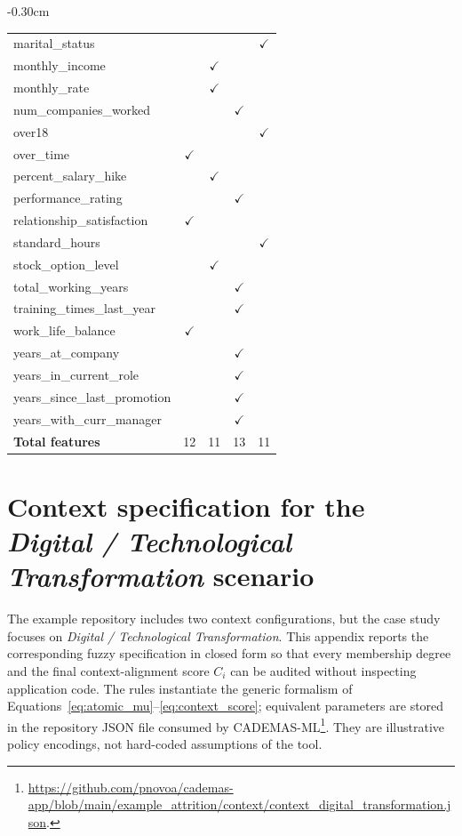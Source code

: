 \documentclass[article,submit,pdftex,moreauthors,mathematics]{Definitions/mdpi}
\begin{document}
\begin{table}[H]
\begin{adjustwidth}{-0.3\extralength}{0cm}
\begin{tabularx}{1.1\textwidth}{l|cccc}
marital\_status &  &  &  & $\checkmark$ \\
monthly\_income &  & $\checkmark$ &  &  \\
monthly\_rate &  & $\checkmark$ &  &  \\
num\_companies\_worked &  &  & $\checkmark$ &  \\
over18 &  &  &  & $\checkmark$ \\
over\_time & $\checkmark$ &  &  &  \\
percent\_salary\_hike &  & $\checkmark$ &  &  \\
performance\_rating &  &  & $\checkmark$ &  \\
relationship\_satisfaction & $\checkmark$ &  &  &  \\
standard\_hours &  &  &  & $\checkmark$ \\
stock\_option\_level &  & $\checkmark$ &  &  \\
total\_working\_years &  &  & $\checkmark$ &  \\
training\_times\_last\_year &  &  & $\checkmark$ &  \\
work\_life\_balance & $\checkmark$ &  &  &  \\
years\_at\_company &  &  & $\checkmark$ &  \\
years\_in\_current\_role &  &  & $\checkmark$ &  \\
years\_since\_last\_promotion &  &  & $\checkmark$ &  \\
years\_with\_curr\_manager &  &  & $\checkmark$ &  \\
\midrule
\textbf{Total features} & 12 & 11 & 13 & 11 \\
\bottomrule
\end{tabularx}
\end{adjustwidth}
\end{table}

\section{Context specification for the \textit{Digital / Technological Transformation} scenario}\label{app:context_specs}

The example repository includes two context configurations, but the case study focuses on \textit{Digital / Technological Transformation}. This appendix reports the corresponding fuzzy specification in closed form so that every membership degree and the final context-alignment score $C_i$ can be audited without inspecting application code. The rules instantiate the generic formalism of Equations~\eqref{eq:atomic_mu}--\eqref{eq:context_score}; equivalent parameters are stored in the repository JSON file consumed by CADEMAS-ML\footnote{\url{https://github.com/pnovoa/cademas-app/blob/main/example_attrition/context/context_digital_transformation.json}.}. They are illustrative policy encodings, not hard-coded assumptions of the tool.
\end{document}
